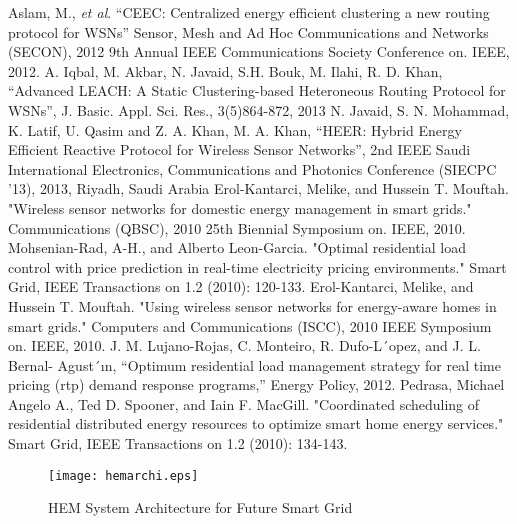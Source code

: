 \documentclass[journal]{IEEEtran}
\begin{document}
\begin{thebibliography}{17}
 Aslam, M., \textit{et al}. ``CEEC: Centralized energy efficient clustering a new routing protocol for WSNs'' Sensor, Mesh and Ad Hoc Communications and Networks (SECON), 2012 9th Annual IEEE Communications Society Conference on. IEEE, 2012.
  A. Iqbal, M. Akbar, N. Javaid, S.H. Bouk, M. Ilahi, R. D. Khan, ``Advanced LEACH: A Static Clustering-based Heteroneous Routing Protocol for WSNs'', J. Basic. Appl. Sci. Res., 3(5)864-872, 2013
  N. Javaid, S. N. Mohammad, K. Latif, U. Qasim and Z. A. Khan, M. A. Khan, ``HEER: Hybrid Energy Efficient Reactive Protocol for Wireless Sensor Networks'', 2nd IEEE Saudi International Electronics, Communications and Photonics Conference (SIECPC ’13), 2013, Riyadh, Saudi Arabia
 Erol-Kantarci, Melike, and Hussein T. Mouftah. "Wireless sensor networks for domestic energy management in smart grids." Communications (QBSC), 2010 25th Biennial Symposium on. IEEE, 2010.
 Mohsenian-Rad, A-H., and Alberto Leon-Garcia. "Optimal residential load control with price prediction in real-time electricity pricing environments." Smart Grid, IEEE Transactions on 1.2 (2010): 120-133.
 Erol-Kantarci, Melike, and Hussein T. Mouftah. "Using wireless sensor networks for energy-aware homes in smart grids." Computers and Communications (ISCC), 2010 IEEE Symposium on. IEEE, 2010.
 J. M. Lujano-Rojas, C. Monteiro, R. Dufo-L´opez, and J. L. Bernal- Agust´ın, “Optimum residential load management strategy for real time pricing (rtp) demand response programs,” Energy Policy, 2012.
 Pedrasa, Michael Angelo A., Ted D. Spooner, and Iain F. MacGill. "Coordinated scheduling of residential distributed energy resources to optimize smart home energy services." Smart Grid, IEEE Transactions on 1.2 (2010): 134-143.
\end{thebibliography}

\begin{figure}[!h]
\centering
\texttt{[image: hemarchi.eps]}
\caption{HEM System Architecture for Future Smart Grid}
\end{figure}
\end{document}
